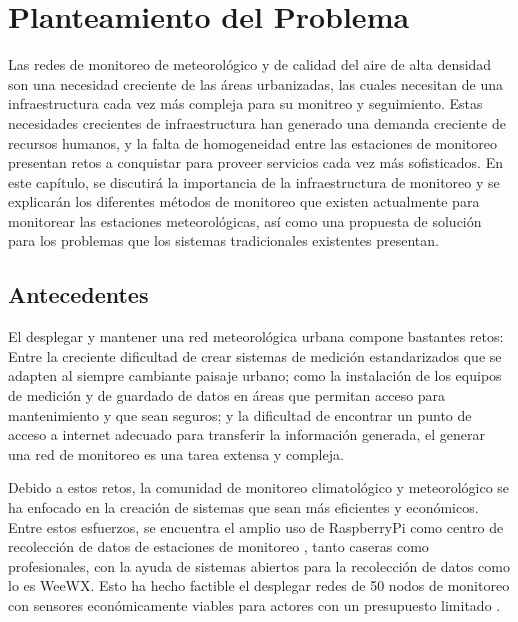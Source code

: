 \chapter{Planteamiento del Problema}

Las redes de monitoreo de meteorológico y de calidad del aire de alta densidad son una necesidad creciente de las áreas urbanizadas, las cuales necesitan de una infraestructura cada vez más compleja para su monitreo y seguimiento. Estas necesidades crecientes de infraestructura han generado una demanda creciente de recursos humanos, y la falta de homogeneidad entre las estaciones de monitoreo presentan retos a conquistar para proveer servicios cada vez más sofisticados. En este capítulo, se discutirá la importancia de la infraestructura de monitoreo y se explicarán los diferentes métodos de monitoreo que existen actualmente para monitorear las estaciones meteorológicas, así como una propuesta de solución para los problemas que los sistemas tradicionales existentes presentan.

\section{Antecedentes}

El desplegar y mantener una red meteorológica urbana compone bastantes retos: Entre la creciente dificultad de crear sistemas de medición estandarizados que se adapten al siempre cambiante paisaje urbano; como la instalación de los equipos de medición y de guardado de datos en áreas que permitan acceso para mantenimiento y que sean seguros; y la dificultad de encontrar un punto de acceso a internet adecuado para transferir la información generada, el generar una red de monitoreo es una tarea extensa y compleja.

Debido a estos retos, la comunidad de monitoreo climatológico y meteorológico se ha enfocado en la creación de sistemas que sean más eficientes y económicos. Entre estos esfuerzos, se encuentra el amplio uso de RaspberryPi como centro de recolección de datos de estaciones de monitoreo \cite{rpi_weataher_station}, tanto caseras como profesionales, con la ayuda de sistemas abiertos para la recolección de datos como lo es WeeWX. Esto ha hecho factible el desplegar redes de 50 nodos de monitoreo con sensores económicamente viables para actores con un presupuesto limitado \cite{monitoreo_raspberry_nagios}.


